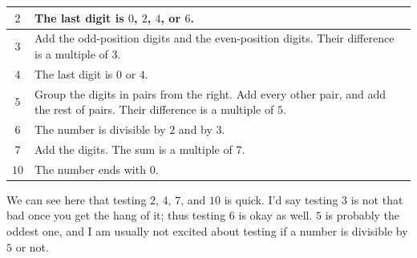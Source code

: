\begin{center}
\renewcommand{\arraystretch}{1.2}
\begin{tabular}{|c|p{5.15in}|}
\hline
$2$ & The last digit is $0$, $2$, $4$, or $6$. \\
\hline
$3$ & Add the odd-position digits and the even-position digits. Their difference is a multiple of $3$. \\
\hline
$4$ & The last digit is $0$ or $4$. \\
\hline
$5$ & Group the digits in pairs from the right. Add every other pair, and add the rest of pairs. Their difference is a multiple of $5$. \\
\hline
$6$\index{divisibility!by 6} & The number is divisible by $2$ and by $3$. \\
\hline
$7$ & Add the digits. The sum is a multiple of $7$. \\
\hline
$10$\index{divisibility!by 10} & The number ends with $0$. \\
\hline
\end{tabular}
\end{center}

We can see here that testing $2$, $4$, $7$, and $10$ is quick. I'd say testing $3$ is not that bad once you get the hang of it; thus testing $6$ is okay as well. $5$ is probably the oddest one, and I am usually not excited about testing if a number is divisible by $5$ or not.

